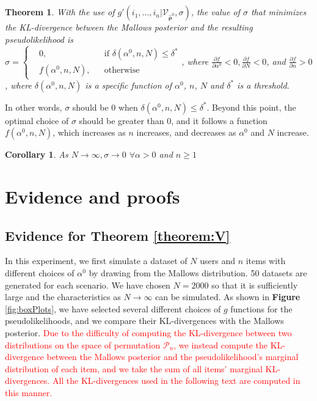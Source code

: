 \documentclass[11pt, oneside]{article}   	%
\newtheorem{theorem}{Theorem}[subsection]
\newtheorem{corollary}{Corollary}[theorem]
\begin{document}
\subsection{ }
\begin{theorem}\label{theorem:sigmafunction}
With the use of  $g'(i_1, ...,i_n|\mathcal{V}_{\hat{\bm{\rho}}^0}, \sigma)$, the value of $\sigma$ that minimizes the KL-divergence between the Mallows posterior and the resulting pseudolikelihood is\\
 $
\sigma = \left \{
\begin{aligned}
&0, && \text{if } \delta(\alpha^0,n,N)\leq \delta ^{*} \\
&f(\alpha^0, n,N), && \text{otherwise}
\end{aligned} \right.
$, where $\frac{\partial f}{\partial \alpha^0} <0, \frac{\partial f}{\partial N} <0$, and $\frac{\partial f}{\partial n} >0$, where $\delta(\alpha^0, n,N)$ is a specific function of $\alpha^0$, $n$, $N$ and $\delta ^*$ is a threshold.
\end{theorem}

In other words, $\sigma$ should be 0 when $\delta(\alpha^0,n,N) \leq \delta^*$. Beyond this point, the optimal choice of $\sigma$ should be greater than 0, and it follows a function $f(\alpha^0,n,N)$, which increases as $n$ increases, and decreases as $\alpha^0$ and $N$ increase.
\begin{corollary}
	As $N \rightarrow \infty,\sigma \rightarrow 0$  $ \forall \alpha >0$ and $n \geq 1$
\end{corollary}

\section{Evidence and proofs}
\subsection{Evidence for Theorem \ref{theorem:V}}
In this experiment, we first simulate a dataset of $N$ users and $n$ items with different choices of $\alpha^0$ by drawing from the Mallows distribution.  50 datasets are generated for each scenario. We have chosen $N = 2000$ so that it is sufficiently large and the characteristics as $N \rightarrow \infty$ can be simulated. As shown in \textbf{Figure} \ref{fig:boxPlots}, we have selected several different choices of $g$ functions for the pseudolikelihoods, and we compare their KL-divergences with the Mallows posterior. \textcolor{red}{Due to the difficulty of computing the KL-divergence between two distributions on the space of permutation $\mathcal{P}_n$, we instead compute the KL-divergence between the Mallows posterior and the pseudolikelihood's marginal distribution of each item, and we take the sum of all items' marginal KL-divergences. All the KL-divergences used in the following text are computed in this manner.} 
\end{document}
